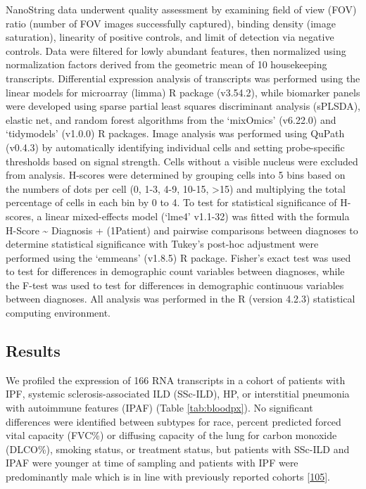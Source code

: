 \documentclass[
]{article}
\begin{document}
NanoString data underwent quality assessment by examining field of view (FOV) ratio (number of FOV images successfully captured), binding density (image saturation), linearity of positive controls, and limit of detection via negative controls. Data were filtered for lowly abundant features, then normalized using normalization factors derived from the geometric mean of 10 housekeeping transcripts. Differential expression analysis of transcripts was performed using the linear models for microarray (limma) R package (v3.54.2), while biomarker panels were developed using sparse partial least squares discriminant analysis (sPLSDA), elastic net, and random forest algorithms from the `mixOmics' (v6.22.0) and `tidymodels' (v1.0.0) R packages. Image analysis was performed using QuPath (v0.4.3) by automatically identifying individual cells and setting probe-specific thresholds based on signal strength. Cells without a visible nucleus were excluded from analysis. H-scores were determined by grouping cells into 5 bins based on the numbers of dots per cell (0, 1-3, 4-9, 10-15, \textgreater15) and multiplying the total percentage of cells in each bin by 0 to 4. To test for statistical significance of H-scores, a linear mixed-effects model (`lme4' v1.1-32) was fitted with the formula H-Score \textasciitilde{} Diagnosis + (1\textbar Patient) and pairwise comparisons between diagnoses to determine statistical significance with Tukey's post-hoc adjustment were performed using the `emmeans' (v1.8.5) R package. Fisher's exact test was used to test for differences in demographic count variables between diagnoses, while the F-test was used to test for differences in demographic continuous variables between diagnoses. All analysis was performed in the R (version 4.2.3) statistical computing environment.

\hypertarget{results-1}{%
\subsection{Results}\label{results-1}}

We profiled the expression of 166 RNA transcripts in a cohort of patients with IPF, systemic sclerosis-associated ILD (SSc-ILD), HP, or interstitial pneumonia with autoimmune features (IPAF) (Table \ref{tab:bloodpx}). No significant differences were identified between subtypes for race, percent predicted forced vital capacity (FVC\%) or diffusing capacity of the lung for carbon monoxide (DLCO\%), smoking status, or treatment status, but patients with SSc-ILD and IPAF were younger at time of sampling and patients with IPF were predominantly male which is in line with previously reported cohorts {[}\protect\hyperlink{ref-zaman_differences_2020}{105}{]}.
\end{document}
